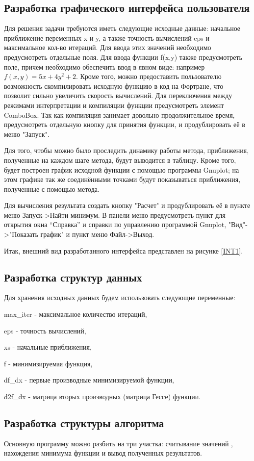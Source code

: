 \subsection{Разработка графического интерфейса пользователя}
Для решения задачи требуются иметь следующие исходные данные: начальное приближение переменных x и y, а также точность вычислений eps и максимальное кол-во итераций. Для ввода этих значений необходимо предусмотреть отдельные поля. Для ввода функции f(x,y) также предусмотреть поле, причем необходимо обеспечить ввод в явном виде: например $f(x,y)=5x+4y^2+2$. Кроме того, можно предоставить пользователю возможность скомпилировать исходную функцию в код на Фортране, что позволит сильно увеличить скорость вычислений. Для переключения между режимами интерпретации и компиляции функции предусмотреть элемент ComboBox. Так как компиляция занимает довольно продолжительное время, предусмотреть отдельную кнопку для принятия функции, и продублировать её в меню "Запуск".

Для того, чтобы можно было проследить динамику работы метода, приближения, полученные на каждом шаге метода, будут выводится в таблицу. Кроме того, будет построен график исходной функции с помощью программы Gnuplot; на этом графике так же соединёнными точками будут показываться приближения, полученные с помощью метода.

Для вычисления результата создать кнопку "Расчет" и продублировать её в пункте меню Запуск->Найти минимум. В панели меню предусмотреть пункт для открытия окна “Справка” и справки по управлению программой Gnuplot, "Вид"->"Показать график" и пункт меню Файл->Выход. 

Итак, внешний вид разработанного интерфейса представлен на рисунке \ref{INT1}.
\subsection{Разработка структур данных}
Для хранения исходных данных будем использовать следующие переменные:

max\_iter - максимальное количество итераций,

eps - точность вычислений,

xs - начальные приближения,

f - минимизируемая функция,

df\_dx - первые производные минимизируемой функции,

d2f\_dx - матрица вторых производных (матрица Гессе) функции.
\subsection{Разработка структуры алгоритма}
Основную программу можно разбить на три участка: считывание значений , нахождения минимума функции и вывод полученных результатов.

